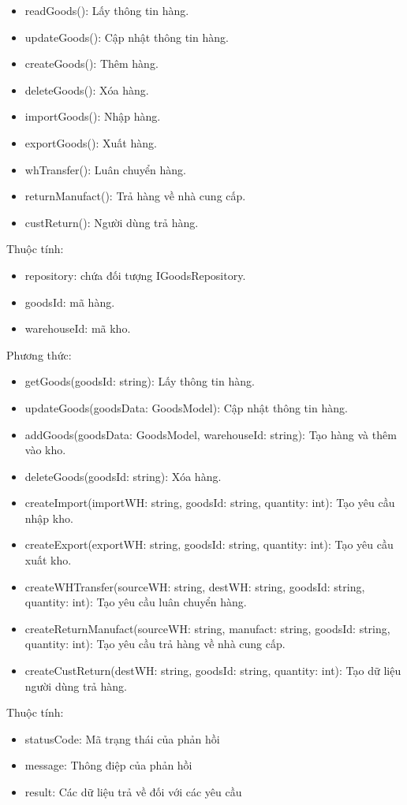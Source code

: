 \begin{itemize}
	\item readGoods(): Lấy thông tin hàng.
	\item updateGoods(): Cập nhật thông tin hàng.
	\item createGoods(): Thêm hàng.
	\item deleteGoods(): Xóa hàng.
	\item importGoods(): Nhập hàng.
	\item exportGoods(): Xuất hàng.
	\item whTransfer(): Luân chuyển hàng.
	\item returnManufact(): Trả hàng về nhà cung cấp.
	\item custReturn(): Người dùng trả hàng.
\end{itemize}

Thuộc tính:
\begin{itemize}
	\item repository: chứa đối tượng IGoodsRepository.
	\item goodsId: mã hàng.
	\item warehouseId: mã kho.
\end{itemize}
Phương thức:
\begin{itemize}
	\item getGoods(goodsId: string): Lấy thông tin hàng.
	\item updateGoods(goodsData: GoodsModel): Cập nhật thông tin hàng.
	\item addGoods(goodsData: GoodsModel, warehouseId: string): Tạo hàng và thêm vào kho.
	\item deleteGoods(goodsId: string): Xóa hàng.
	\item createImport(importWH: string, goodsId: string, quantity: int): Tạo yêu cầu nhập kho.
	\item createExport(exportWH: string, goodsId: string, quantity: int): Tạo yêu cầu xuất kho.
	\item createWHTransfer(sourceWH: string, destWH: string, goodsId: string, quantity: int): Tạo yêu cầu luân chuyển hàng.
	\item createReturnManufact(sourceWH: string, manufact: string, goodsId: string, quantity: int): Tạo yêu cầu trả hàng về nhà cung cấp.
	\item createCustReturn(destWH: string, goodsId: string, quantity: int): Tạo dữ liệu người dùng trả hàng.
\end{itemize}

Thuộc tính:
\begin{itemize}
	\item statusCode: Mã trạng thái của phản hồi
	\item message: Thông điệp của phản hồi
	\item result: Các dữ liệu trả về đối với các yêu cầu
\end{itemize}


